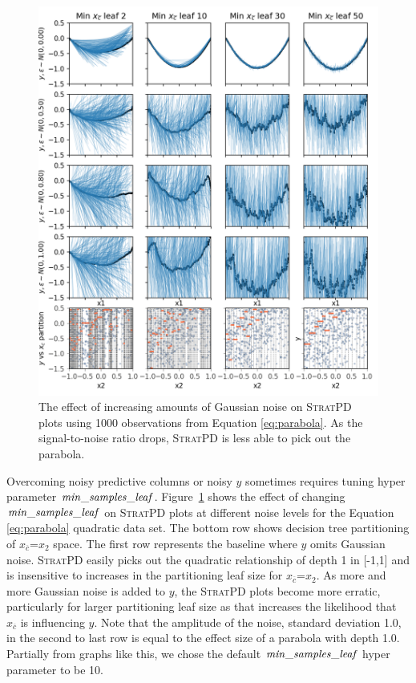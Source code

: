 \documentclass[12pt]{article}
\newcommand{\figref}[1]{Figure~\ref{#1}}
\newcommand{\spd}{\fontfamily{cmr}\textsc{\small StratPD}}
\newcommand{\xnc}{$x_{\overline{c}}$}
\begin{document}
\begin{figure}[htbp]
\begin{center}
\includegraphics[scale=0.7]{images/meta_additivity_noise.png}
\caption{The effect of increasing amounts of Gaussian noise on \spd{} plots using 1000 observations from Equation \eqref{eq:parabola}. As the signal-to-noise ratio drops, \spd{} is less able to pick out the parabola.}
\label{fig:meta_noise}
\end{center}
\end{figure}

Overcoming noisy predictive columns or noisy $y$ sometimes requires tuning hyper parameter ${\it min\_samples\_leaf}$. \figref{fig:meta_noise} shows the effect of changing ${\it min\_samples\_leaf}$ on \spd{} plots at different noise levels for the Equation \eqref{eq:parabola} quadratic data set.   The bottom row shows decision tree partitioning of \xnc{}=$x_2$ space.  The first row represents the baseline where $y$ omits Gaussian noise. \spd{} easily picks out the quadratic relationship of depth 1 in [-1,1] and is insensitive to increases in the partitioning leaf size for \xnc{}=$x_2$.  As more and more Gaussian noise is added to $y$, the \spd{} plots become more erratic, particularly for larger partitioning leaf size as that increases the likelihood that \xnc{} is influencing $y$. Note that the amplitude of the noise, standard deviation 1.0, in the second to last row is equal to the effect size of a parabola with depth 1.0.  Partially from graphs like this, we chose the default ${\it min\_samples\_leaf}$ hyper parameter  to be 10.
\end{document}
